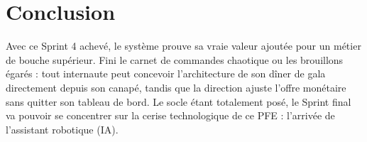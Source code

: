 \section{Conclusion}

Avec ce Sprint 4 achevé, le système prouve sa vraie valeur ajoutée pour un métier de bouche supérieur. Fini le carnet de commandes chaotique ou les brouillons égarés : tout internaute peut concevoir l'architecture de son dîner de gala directement depuis son canapé, tandis que la direction ajuste l'offre monétaire sans quitter son tableau de bord. Le socle étant totalement posé, le Sprint final va pouvoir se concentrer sur la cerise technologique de ce PFE : l'arrivée de l'assistant robotique (IA).

